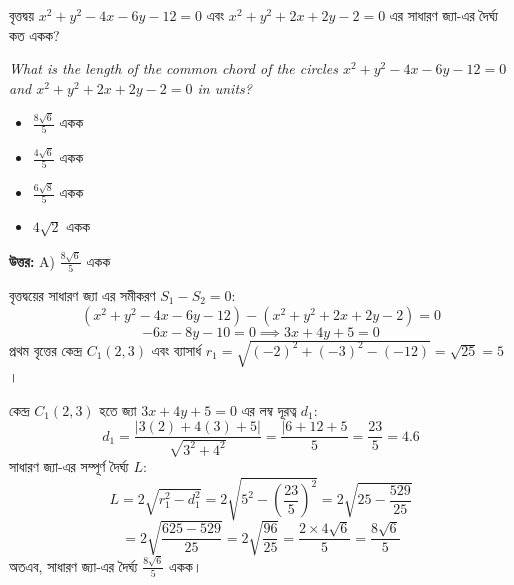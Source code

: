 \documentclass[12pt, a4paper]{article}
\begin{document}
\begin{tcolorbox}[questionbox={প্রশ্ন (Question) 9}]
    \noindent
    বৃত্তদ্বয় $x^2 + y^2 - 4x - 6y - 12 = 0$ এবং $x^2 + y^2 + 2x + 2y - 2 = 0$ এর সাধারণ জ্যা-এর দৈর্ঘ্য কত একক?
    
    \vspace{0.8em}
    \begin{english}
    \noindent\textit{\color{darkgray}
    What is the length of the common chord of the circles $x^2 + y^2 - 4x - 6y - 12 = 0$ and $x^2 + y^2 + 2x + 2y - 2 = 0$ in units?
    }
    \end{english}
\end{tcolorbox}

\begin{itemize}[label={}, leftmargin=1cm, itemsep=0.5em]
    \item[\textbf{A)}] $\frac{8\sqrt{6}}{5}$ একক
    \item[\textbf{B)}] $\frac{4\sqrt{6}}{5}$ একক
    \item[\textbf{C)}] $\frac{6\sqrt{8}}{5}$ একক
    \item[\textbf{D)}] $4\sqrt{2}$ একক
\end{itemize}

\vspace{0.5em}
\begin{tcolorbox}[answerbox]
    \textbf{\color{success} উত্তর:} A) $\frac{8\sqrt{6}}{5}$ একক
\end{tcolorbox}
\vspace{1em}

\begin{tcolorbox}[solutionbox={সমাধান (Solution)}]
    \noindent
    বৃত্তদ্বয়ের সাধারণ জ্যা এর সমীকরণ $S_1 - S_2 = 0$:
    \[ (x^2 + y^2 - 4x - 6y - 12) - (x^2 + y^2 + 2x + 2y - 2) = 0 \]
    \[ -6x - 8y - 10 = 0 \implies 3x + 4y + 5 = 0 \]
    প্রথম বৃত্তের কেন্দ্র $C_1(2, 3)$ এবং ব্যাসার্ধ $r_1 = \sqrt{(-2)^2 + (-3)^2 - (-12)} = \sqrt{25} = 5$। 
    
    \vspace{0.5em}
    কেন্দ্র $C_1(2, 3)$ হতে জ্যা $3x + 4y + 5 = 0$ এর লম্ব দূরত্ব $d_1$:
    \[ d_1 = \frac{|3(2) + 4(3) + 5|}{\sqrt{3^2 + 4^2}} = \frac{|6 + 12 + 5}{5} = \frac{23}{5} = 4.6 \]
    সাধারণ জ্যা-এর সম্পূর্ণ দৈর্ঘ্য $L$:
    \[ L = 2\sqrt{r_1^2 - d_1^2} = 2\sqrt{5^2 - \left(\frac{23}{5}\right)^2} = 2\sqrt{25 - \frac{529}{25}} \]
    \[ = 2\sqrt{\frac{625 - 529}{25}} = 2\sqrt{\frac{96}{25}} = \frac{2 \times 4\sqrt{6}}{5} = \frac{8\sqrt{6}}{5} \]
    অতএব, সাধারণ জ্যা-এর দৈর্ঘ্য $\frac{8\sqrt{6}}{5}$ একক।
\end{tcolorbox}
\end{document}
